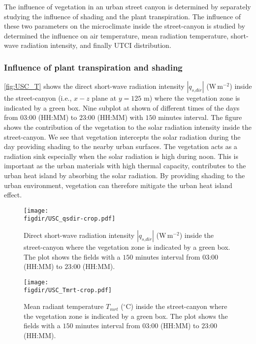 The influence of vegetation in an urban street canyon is determined by separately studying the influence of shading and the plant transpiration. The influence of these two parameters on the microclimate inside the street-canyon is studied by determined the influence on air temperature, mean radiation temperature, short-wave radiation intensity, and finally UTCI distribution. 

\subsubsection*{Influence of plant transpiration and shading}

\cref{fig:USC_T} shows the direct short-wave radiation intensity $|q_{\textit{s,dir}}|$ (W\,m$^{-2}$) inside the street-canyon (i.e., $x-z$ plane at $y=125$ m) where the vegetation zone is indicated by a green box. Nine subplot at shown of different times of the days from $03$:$00$ (HH:MM) to $23$:$00$ (HH:MM) with $150$ minutes interval. The figure shows the contribution of the vegetation to the solar radiation intensity inside the street-canyon. We see that vegetation intercepts the solar radiation during the day providing shading to the nearby urban surfaces. The vegetation acts as a radiation sink especially when the solar radiation is high during noon. This is important as the urban materials with high thermal capacity, contributes to the urban heat island by absorbing the solar radiation. By providing shading to the urban environment, vegetation can therefore mitigate the urban heat island effect.  

\begin{sidewaysfigure}[p]
	\centering
	\texttt{[image: \\figdir/USC\_qsdir-crop.pdf]}
	\caption{Direct short-wave radiation intensity $|q_{\textit{s,dir}}|$ (W\,m$^{-2}$) inside the street-canyon where the vegetation zone is indicated by a green box. The plot shows the fields with a $150$ minutes interval from $03$:$00$ (HH:MM) to $23$:$00$ (HH:MM).}
	\label{fig:USC_qrdir}
\end{sidewaysfigure}

\begin{sidewaysfigure}[p]
	\centering
	\texttt{[image: \\figdir/USC\_Tmrt-crop.pdf]}
	\caption{Mean radiant temperature $T_{\textit{mrt}}$  ($^{\circ}$C) inside the street-canyon where the vegetation zone is indicated by a green box. The plot shows the fields with a $150$ minutes interval from $03$:$00$ (HH:MM) to $23$:$00$ (HH:MM).}
	\label{fig:USC_Tmrt}
\end{sidewaysfigure}


